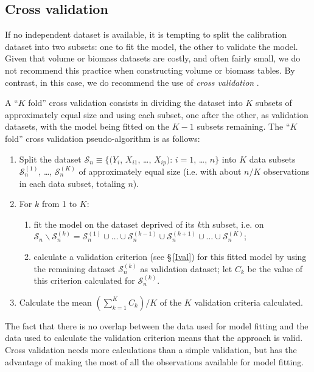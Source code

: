 \subsection{Cross validation}

If no independent dataset is available, it is tempting to split the calibration dataset into two subsets: one to fit the model, the other to validate the model. Given that volume or biomass datasets are costly, and often fairly small, we do not recommend this practice when constructing volume or biomass tables. By contrast, in this case, we do recommend the use of \emph{cross validation} \citep[chapitre 17]{efron93}.

A ``$K$ fold'' cross validation consists in dividing the dataset into $K$ subsets of approximately equal size and using each subset, one after the other, as validation datasets, with
the model being fitted on the $K-1$ subsets remaining. The ``$K$ fold'' cross validation pseudo-algorithm is as follows:
\begin{enumerate}
\item Split the dataset $\mathcal{S}_n\equiv\{(Y_i$,
$X_{i1}$, \ldots, $X_{ip})$: $i=1$, \ldots, $n\}$ into $K$ data subsets $\mathcal{S}_n^{(1)}$, \ldots, $\mathcal{S}_n^{(K)}$ of approximately equal size (i.e. with about $n/K$
observations in each data subset, totaling $n$).
\item For $k$ from 1 to $K$:
    \begin{enumerate}
    \item fit the model on the dataset deprived of its 
    $k$th subset, i.e. on
    $\mathcal{S}_n\backslash\mathcal{S}_n^{(k)}=\mathcal{S}_n^{(1)}
    \cup\ldots\cup\mathcal{S}_n^{(k-1)}\cup\mathcal{S}_n^{(k+1)}\cup
    \ldots\cup\mathcal{S}_n^{(K)}$;
    \item calculate a validation criterion (see \S\,\ref{Ival}) for this fitted model by using the remaining dataset 
		$\mathcal{S}_n^{(k)}$ as validation dataset; let $C_k$ be the value of this criterion calculated for 
    $\mathcal{S}_n^{(k)}$.
    \end{enumerate}
\item Calculate the mean $(\sum_{k=1}^KC_k)/K$ of the $K$ validation criteria calculated.
\end{enumerate}
The fact that there is no overlap between the data used for model fitting and the data used to calculate the validation criterion means that the approach is valid. Cross validation needs more calculations than a simple validation, but has the advantage of making the most of all the observations available for model fitting.

